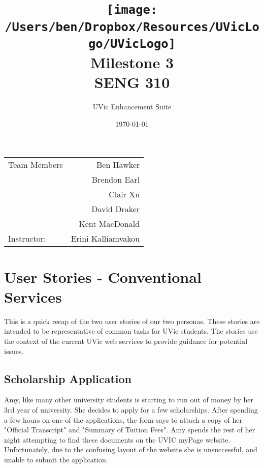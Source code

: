 \documentclass{article}
\title{\texttt{[image: /Users/ben/Dropbox/Resources/UVicLogo/UVicLogo]} \\ \vspace{7mm} Milestone 3 \\ SENG 310} %
\author{UVic Enhancement Suite} %
\date{\today} %
\begin{document}
\maketitle %

\begin{center}
\begin{tabular}{l r}
Team Members & Ben Hawker \\
 & Brendon Earl \\
 & Clair Xu \\
 & David Draker \\
 & Kent MacDonald \\
Instructor: & Erini Kalliamvakou  %
\end{tabular}
\end{center}


\tableofcontents
\pagebreak


\section{User Stories - Conventional Services}

This is a quick recap of the two user stories of our two personas. These stories are intended to be representative of common tasks for UVic students. The stories  use the context of the current UVic web services to provide guidance for potential issues.

\subsection{Scholarship Application}

Amy, like many other university students is starting to run out of money by her 3rd year of university. She decides to apply for a few scholarships. After spending a few hours on one of the applications, the form says to attach a copy of her "Official Transcript" and "Summary of Tuition Fees". Amy spends the rest of her night attempting to find these documents on the UVIC myPage website. Unfortunately, due to the confusing layout of the website she is unsuccessful, and unable to submit the application.
\end{document}
